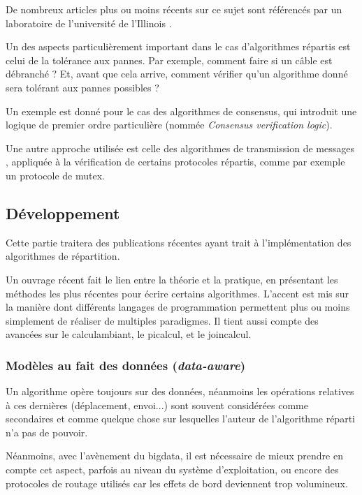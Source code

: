 De nombreux articles plus ou moins récents sur ce sujet sont référencés par un laboratoire de l'université de l'Illinois \cite{formaldistributed}.

Un des aspects particulièrement important dans le cas d'algorithmes répartis est celui de la tolérance aux pannes. Par exemple, comment faire si un câble est débranché ? Et, avant que cela arrive, comment vérifier qu'un algorithme donné sera tolérant aux pannes possibles ? 

Un exemple est donné \cite{mcmillan2014verification} pour le cas des algorithmes de consensus, qui introduit une logique de premier ordre particulière (nommée \textit{Consensus verification logic}).

Une autre approche utilisée est celle des algorithmes de transmission de messages \cite{jezequel2014message}, appliquée à la vérification de certains protocoles répartis, comme par exemple un protocole de \gls{mutex}.

\subsection{Développement}
Cette partie traitera des publications récentes ayant trait à l'implémentation des algorithmes de répartition.

Un ouvrage récent \cite{varela2013programming} fait le lien entre la théorie et la pratique, en présentant les méthodes les plus récentes pour écrire certains algorithmes. L'accent est mis sur la manière dont différents langages de programmation permettent plus ou moins simplement de réaliser de multiples paradigmes. Il tient aussi compte des avancées sur le \gls{calculambiant}, le \gls{picalcul}, et le \gls{joincalcul}.

\subsubsection{Modèles au fait des données (\textit{data-aware})}
Un algorithme opère toujours sur des données, néanmoins les opérations relatives à ces dernières (déplacement, envoi...) sont souvent considérées comme secondaires et comme quelque chose sur lesquelles l'auteur de l'algorithme réparti n'a pas de pouvoir.

Néanmoins, avec l'avènement du \gls{bigdata}, il est nécessaire de mieux prendre en compte cet aspect, parfois au niveau du système d'exploitation, ou encore des protocoles de routage utilisés \cite{baehni2004dependable} car les effets de bord deviennent trop volumineux.

